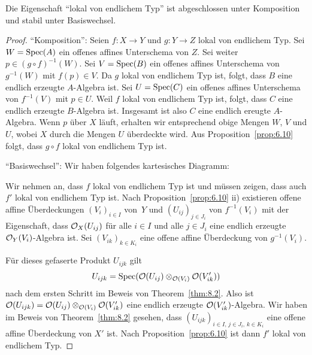 \begin{prop}
\label{prop:8.11}
	Die Eigenschaft \enquote{lokal von endlichem Typ} ist abgeschlossen unter Komposition und stabil unter Basiswechsel.
	\begin{proof}
		\enquote{Komposition}: Seien $f\colon X \to Y$ und $g \colon Y \to Z$ lokal von endlichem Typ. Sei $W = \operatorname{Spec}(A)$ ein offenes affines Unterschema von $Z$. Sei weiter $p \in (g \circ f)^{-1}(W)$. Sei $V=\operatorname{Spec}(B)$ ein offenes affines Unterschema von $g^{-1}(W)$ mit $f(p) \in V$. Da $g$ lokal von endlichem Typ ist, folgt, dass $B$ eine endlich erzeugte $A$-Algebra ist. Sei $U = \operatorname{Spec}(C)$ ein offenes affines Unterschema von $f^{-1}(V)$ mit $p \in U$. Weil $f$ lokal von endlichem Typ ist, folgt, dass $C$ eine endlich erzeugte $B$-Algebra ist. Insgesamt ist also $C$ eine endlich ereugte $A$-Algebra. Wenn $p$ über $X$ läuft, erhalten wir entsprechend obige Mengen $W$, $V$ und $U$, wobei $X$ durch die Mengen $U$ überdeckte wird. Aus Proposition~\ref{prop:6.10} folgt, dass $g\circ f$ lokal von endlichem Typ ist.

		\enquote{Basiswechsel}: Wir haben folgendes kartesisches Diagramm:
		\begin{center}
		\end{center}
		Wir nehmen an, dass $f$ lokal von endlichem Typ ist und müssen zeigen, dass auch $f'$ lokal von endlichem Typ ist. Nach Proposition~\ref{prop:6.10} ii) existieren offene affine Überdeckungen $(V_i)_{i\in I}$ von~$Y$ und $(U_{ij})_{j\in J_i}$ von $f^{-1}(V_i)$ mit der Eigenschaft, dass $\mathcal{O}_X(U_{ij})$ für alle $i\in I$ und alle $j \in J_i$ eine endlich erzeugte $\mathcal{O}_Y(V_i)$-Algebra ist. Sei $(V_{ik})_{k \in K_i}$ eine offene affine Überdeckung von $g^{-1}(V_i)$.
		\begin{center}
		\end{center}
		Für dieses gefaserte Produkt $U_{ijk}$ gilt
		\[
			U_{ijk} = \operatorname{Spec}(\mathcal{O}(U_{ij}) \otimes_{\mathcal{O}(V_i)} \mathcal{O}(V_{ik}'))
		\]
		nach dem ersten Schritt im Beweis von Theorem~\ref{thm:8.2}. Also ist $\mathcal{O}(U_{ijk}) = \mathcal{O}(U_{ij}) \otimes_{\mathcal{O}(V_i)} \mathcal{O}(V_{ik}')$ eine endlich erzeugte $\mathcal{O}(V_{ik}')$-Algebra. Wir haben im Beweis von Theorem~\ref{thm:8.2} gesehen, dass $(U_{ijk})_{i\in I,\,j\in J_i,\,k\in K_i}$ eine offene affine Überdeckung von $X'$ ist. Nach Proposition~\ref{prop:6.10} ist dann $f'$ lokal von endlichem Typ.
	\end{proof}
\end{prop}

